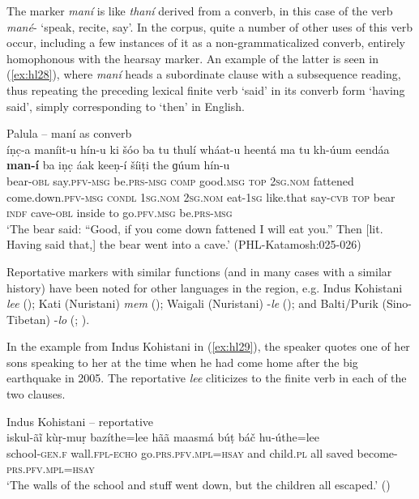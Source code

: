 \documentclass[output=paper]{langsci/langscibook}
\begin{document}
The marker \textit{maní} is like \textit{thaní} derived from a converb, in this case of the verb \textit{mané}- ‘speak, recite, say’. In the corpus, quite a number of other uses of this verb occur, including a few instances of it as a non-grammaticalized converb, entirely homophonous with the hearsay marker. An example of the latter is seen in ‎(\ref{ex:hl28}), where \textit{maní} heads a subordinate clause with a subsequence reading, thus repeating the preceding lexical finite verb ‘said’ in its converb form ‘having said’, simply corresponding to ‘then’ in English.

\begin{exe}
\ex Palula -- maní as converb \label{ex:hl28}\\
	\gll íṇc̣-a maníit-u hín-u ki  šóo ba tu thulí wháat-u heentá ma tu kh-úum eendáa \textbf{man-í} ba iṇc̣ áak keeṇ-í šíiṭi the ɡúum hín-u\\
	bear-\textsc{obl} say.\textsc{pfv}-\textsc{msg} be.\textsc{prs}-\textsc{msg} \textsc{comp} good.\textsc{msg} \textsc{top} 2\textsc{sg}.\textsc{nom} fattened come.down.\textsc{pfv}-\textsc{msg} \textsc{condl} 1\textsc{sg}.\textsc{nom} 2\textsc{sg}.\textsc{nom} eat-1\textsc{sg} like.that say-\textsc{cvb} \textsc{top} bear \textsc{indf} cave-\textsc{obl} inside to go.\textsc{pfv}.\textsc{msg} be.\textsc{prs}-\textsc{msg}\\
	\trans ‘The bear said: “Good, if you come down fattened I will eat you.” Then [lit. Having said that,] the bear went into a cave.’ (PHL-Katamosh:025-026) 
\end{exe}

Reportative markers with similar functions (and in many cases with a similar history) have been noted for other languages in the region, e.g. Indus Kohistani \textit{lee} (\citealt[22--23]{Lubberger2014}); Kati (Nuristani) \textit{mem} (\citealt{Strand2016}); Waigali (Nuristani) -\textit{le} (\citealt[173–182]{Degener1998}); and Balti/Purik (Sino-Tibetan) -\textit{lo} (\citealt[57--62]{Jones2009}; \citealt[776--792]{Zemp2013}).

In the example from Indus Kohistani in ‎(\ref{ex:hl29}), the speaker quotes one of her sons speaking to her at the time when he had come home after the big earthquake in 2005. The reportative \textit{lee} cliticizes to the finite verb in each of the two clauses.

\begin{exe}
\ex Indus Kohistani -- reportative \label{ex:hl29}\\
	\gll iskul-ãĩ kùṛ-muṛ bazíthe=lee hãã maasmá búṭ báč hu-úthe=lee\\
	school-\textsc{gen}.\textsc{f} wall.\textsc{fpl}-\textsc{echo} go.\textsc{prs}.\textsc{pfv}.\textsc{mpl}=\textsc{hsay} and child.\textsc{pl} all saved become-\textsc{prs}.\textsc{pfv}.\textsc{mpl}=\textsc{hsay}\\
	\trans ‘The walls of the school and stuff went down, but the children all escaped.’ (\citealt[26--27]{Lubberger2014})
\end{exe}
\end{document}
